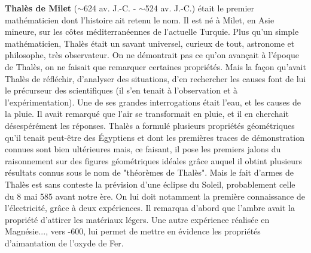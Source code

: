 \textbf{Thalès de Milet} ($\sim$624 av. J.-C. - $\sim$524 av. J.-C.) était le premier mathématicien dont l'histoire ait retenu le nom. Il est né à Milet, en Asie mineure, sur les côtes méditerranéennes de l'actuelle Turquie. Plus qu'un simple mathématicien, Thalès était un savant universel, curieux de tout, astronome et philosophe, très observateur. On ne démontrait pas ce qu'on avançait à l'époque de Thalès, on ne faisait que remarquer certaines propriétés. Mais la façon qu'avait Thalès de réfléchir, d'analyser des situations, d'en rechercher les causes font de lui le précurseur des scientifiques (il s'en tenait à l'observation et à l'expérimentation). Une de ses grandes interrogations était l'eau, et les causes de la pluie. Il avait remarqué que l'air se transformait en pluie, et il en cherchait désespérément les réponses. Thalès a formulé plusieurs propriétés géométriques qu'il tenait peut-être des Égyptiens et dont les premières traces de démonstration connues sont bien ultérieures mais, ce faisant, il pose les premiers jalons du raisonnement sur des figures géométriques idéales grâce auquel il obtint plusieurs résultats connus sous le nom de "théorèmes de Thalès". Mais le fait d'armes de Thalès est sans conteste la prévision d'une éclipse du Soleil, probablement celle du 8 mai 585 avant notre ère. On lui doit notamment la première connaissance de l'électricité, grâce à deux expériences. Il remarqua d'abord que l'ambre avait la propriété d'attirer les matériaux légers. Une autre expérience réalisée en Magnésie..., vers -600, lui permet de mettre en évidence les propriétés d'aimantation de l'oxyde de Fer.

